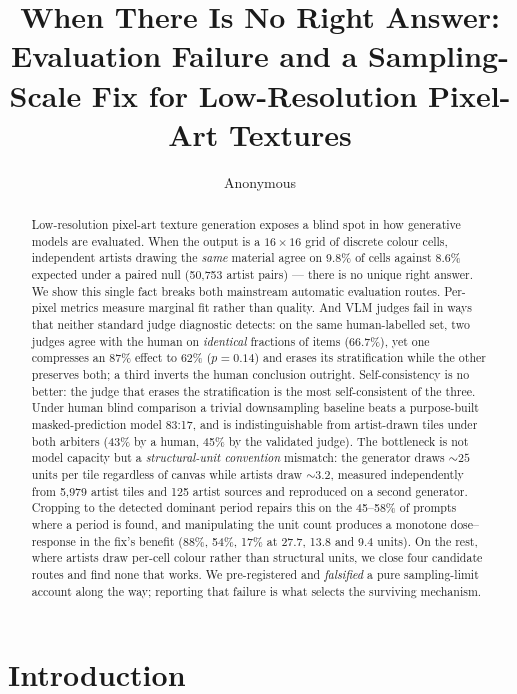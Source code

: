 \documentclass{article}
\title{When There Is No Right Answer:\\Evaluation Failure and a Sampling-Scale
Fix for Low-Resolution Pixel-Art Textures}
\author{Anonymous}
\begin{document}
\maketitle

\begin{abstract}
Low-resolution pixel-art texture generation exposes a blind spot in how
generative models are evaluated. When the output is a $16\times16$ grid of
discrete colour cells, independent artists drawing the \emph{same} material
agree on 9.8\% of cells against 8.6\% expected under a paired null
(50{,}753 artist pairs) --- there is no unique right answer. We show this
single fact breaks both mainstream automatic evaluation routes. Per-pixel
metrics measure marginal fit rather than quality. And VLM judges fail in ways
that neither standard judge diagnostic detects: on the same human-labelled set,
two judges agree with the human on \emph{identical} fractions of items
(66.7\%), yet one compresses an 87\% effect to 62\% ($p{=}0.14$) and erases
its stratification while the other preserves both; a third inverts the human
conclusion outright. Self-consistency is no better: the judge that erases the
stratification is the most self-consistent of the three. Under human blind comparison a trivial downsampling
baseline beats a purpose-built masked-prediction model 83:17, and is
indistinguishable from artist-drawn tiles under both arbiters (43\% by a
human, 45\% by the validated judge). The bottleneck
is not model capacity but a \emph{structural-unit convention} mismatch: the
generator draws ${\sim}25$ units per tile regardless of canvas while artists
draw ${\sim}3.2$, measured independently from 5{,}979 artist tiles and 125
artist sources and reproduced on a second generator. Cropping to the detected dominant period repairs this on the
45--58\% of prompts where a period is found, and manipulating the unit count
produces a monotone dose--response in the fix's benefit (88\%, 54\%, 17\% at
27.7, 13.8 and 9.4 units). On the rest, where artists draw per-cell colour
rather than structural units, we close four candidate routes and find none
that works. We pre-registered and \emph{falsified} a pure sampling-limit
account along the way; reporting that failure is what selects the surviving
mechanism.
\end{abstract}

\section{Introduction}
\label{sec:intro}
\end{document}
